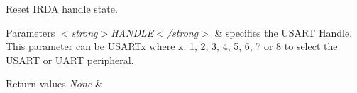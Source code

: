 Reset I\+R\+DA handle state. 


\begin{DoxyParams}{Parameters}
{\em $<$strong$>$\+H\+A\+N\+D\+L\+E$<$/strong$>$} & specifies the U\+S\+A\+RT Handle. This parameter can be U\+S\+A\+R\+Tx where x\+: 1, 2, 3, 4, 5, 6, 7 or 8 to select the U\+S\+A\+RT or U\+A\+RT peripheral. \\
\hline
\end{DoxyParams}

\begin{DoxyRetVals}{Return values}
{\em None} & \\
\hline
\end{DoxyRetVals}
